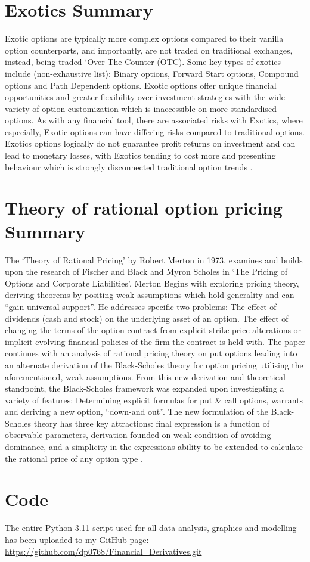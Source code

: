 \documentclass[
	a4paper, %
	11pt, %
	twoside, %
]{LTJournalArticle}
\begin{document}
\section{Exotics Summary}
Exotic options are typically more complex options compared to their vanilla option counterparts, and importantly, are not traded on traditional exchanges, instead, being traded `Over-The-Counter (OTC). 
Some key types of exotics include (non-exhaustive list): Binary options, Forward Start options, Compound options and Path Dependent options. 
Exotic options offer unique financial opportunities and greater flexibility over investment strategies with the wide variety of option customization which is inaccessible on more standardised options. 
As with any financial tool, there are associated risks with Exotics, where especially, Exotic options can have differing risks compared to traditional options. 
Exotics options logically do not guarantee profit returns on investment and can lead to monetary losses,  with Exotics tending to cost more and presenting behaviour which is strongly disconnected traditional option trends \cite{Exotics}.

\section{Theory of rational option pricing Summary}
\label{App:C}
The `Theory of Rational Pricing' by Robert Merton in 1973, examines and builds upon the research of Fischer and Black and Myron Scholes in `The Pricing of Options and Corporate Liabilities'. Merton Begins with exploring pricing theory, deriving theorems by positing weak assumptions which hold generality and can “gain universal support”. 
He addresses specific two problems: The effect of dividends (cash and stock) on the underlying asset of an option. 
The effect of changing the terms of the option contract from explicit strike price alterations or implicit evolving financial policies of the firm the contract is held with. 
The paper continues with an analysis of rational pricing theory on put options leading into an alternate derivation of the Black-Scholes theory for option pricing utilising the aforementioned, weak assumptions.
From this new derivation and theoretical standpoint, the Black-Scholes framework was expanded upon investigating a variety of features: Determining explicit formulas for put \& call options, warrants and deriving a new option, “down-and out”. 
The new formulation of the Black-Scholes theory has three key attractions: final expression is a function of observable parameters, derivation founded on weak condition of avoiding dominance, and a simplicity in the expressions ability to be extended to calculate the rational price of any option type \cite{MERTON_73}.

\section{Code}
\label{App:D}
The entire Python 3.11 script used for all data analysis, graphics and modelling has been uploaded to my GitHub page:
\\

\noindent\url{https://github.com/dp0768/Financial_Derivatives.git}
\end{document}
